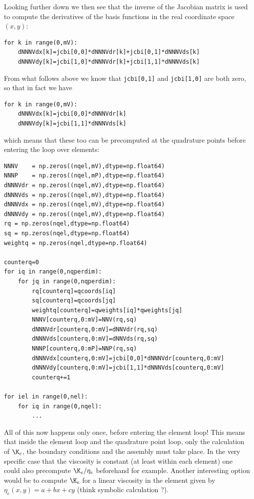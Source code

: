 Looking further down we then see that the inverse of the Jacobian matrix 
is used to compute the derivatives of the basis functions in the real 
coordinate space $(x,y)$:
\begin{lstlisting}
for k in range(0,mV):
    dNNNVdx[k]=jcbi[0,0]*dNNNVdr[k]+jcbi[0,1]*dNNNVds[k]
    dNNNVdy[k]=jcbi[1,0]*dNNNVdr[k]+jcbi[1,1]*dNNNVds[k]
\end{lstlisting}
From what follows above we know that {\tt jcbi[0,1]} and {\tt jcbi[1,0]} are 
both zero, so that in fact we have 
\begin{lstlisting}
for k in range(0,mV):
    dNNNVdx[k]=jcbi[0,0]*dNNNVdr[k]
    dNNNVdy[k]=jcbi[1,1]*dNNNVds[k]
\end{lstlisting}
which means that these too can be precomputed at the quadrature points before entering 
the loop over elements:
\begin{lstlisting}
NNNV    = np.zeros((nqel,mV),dtype=np.float64) 
NNNP    = np.zeros((nqel,mP),dtype=np.float64) 
dNNNVdr = np.zeros((nqel,mV),dtype=np.float64) 
dNNNVds = np.zeros((nqel,mV),dtype=np.float64) 
dNNNVdx = np.zeros((nqel,mV),dtype=np.float64) 
dNNNVdy = np.zeros((nqel,mV),dtype=np.float64) 
rq = np.zeros(nqel,dtype=np.float64) 
sq = np.zeros(nqel,dtype=np.float64) 
weightq = np.zeros(nqel,dtype=np.float64) 
 
counterq=0 
for iq in range(0,nqperdim):
    for jq in range(0,nqperdim):
        rq[counterq]=qcoords[iq]
        sq[counterq]=qcoords[jq]
        weightq[counterq]=qweights[iq]*qweights[jq]
        NNNV[counterq,0:mV]=NNV(rq,sq)
        dNNNVdr[counterq,0:mV]=dNNVdr(rq,sq)
        dNNNVds[counterq,0:mV]=dNNVds(rq,sq)
        NNNP[counterq,0:mP]=NNP(rq,sq)
        dNNNVdx[counterq,0:mV]=jcbi[0,0]*dNNNVdr[counterq,0:mV]
        dNNNVdy[counterq,0:mV]=jcbi[1,1]*dNNNVds[counterq,0:mV]
        counterq+=1

for iel in range(0,nel):
    for iq in range(0,nqel):
        ...
\end{lstlisting}
All of this now happens only once, before entering the element loop!
This means that inside the element loop and the quadrature point loop, 
only the calculation of $\K_e$, the boundary conditions and the assembly 
must take place.
In the very specific case that the viscosity is constant (at least within each element)
one could also precompute $\K_e/\eta_e$ beforehand for example. 
Another interesting option would be to compute $\K_e$ for a linear viscosity in the
element given by $\eta_e(x,y)=a+bx+cy$ (think symbolic calculation ?).

